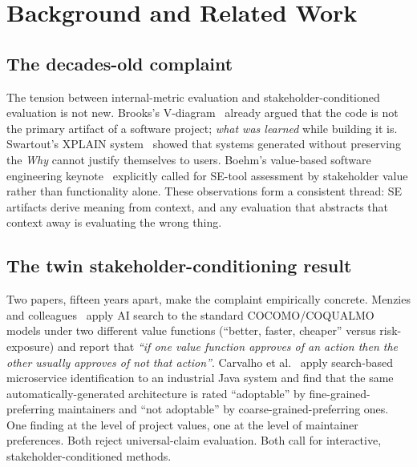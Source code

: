 \documentclass[10pt,conference]{IEEEtran}
\begin{document}
\section{Background and Related Work}
\label{sec:background}

\subsection{The decades-old complaint}
The tension between internal-metric evaluation and stakeholder-conditioned
evaluation is not new. Brooks's V-diagram~\cite{brooks1976mythical} already
argued that the code is not the primary artifact of a software project;
\emph{what was learned} while building it is. Swartout's XPLAIN
system~\cite{swartout1983xplain} showed that systems generated without
preserving the \emph{Why} cannot justify themselves to users. Boehm's
value-based software engineering keynote~\cite{boehm2004valuebased}
explicitly called for SE-tool assessment by stakeholder value rather than
functionality alone. These observations form a consistent thread: SE artifacts
derive meaning from context, and any evaluation that abstracts that context
away is evaluating the wrong thing.

\subsection{The twin stakeholder-conditioning result}
Two papers, fifteen years apart, make the complaint empirically concrete.
Menzies and colleagues~\cite{menzies2009value} apply AI search to the
standard COCOMO/COQUALMO models under two different value functions
(``better, faster, cheaper'' versus risk-exposure) and report that
\emph{``if one value function approves of an action then the other usually
approves of not that action''}. Carvalho et al.~\cite{carvalho2024usefulness}
apply search-based microservice identification to an industrial Java system
and find that the same automatically-generated architecture is rated
``adoptable'' by fine-grained-preferring maintainers and ``not adoptable'' by
coarse-grained-preferring ones. One finding at the level of project values,
one at the level of maintainer preferences. Both reject universal-claim
evaluation. Both call for interactive, stakeholder-conditioned methods.
\end{document}
